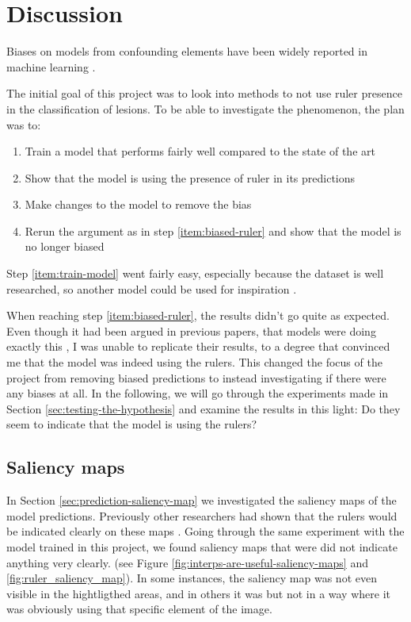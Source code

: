 \chapter{Discussion}
Biases on models from confounding elements have been widely reported in machine learning
\cite{DeConstructing_Bias_on_Skin_Lesion_Datasets_2019, Towards_Explainable_Classifiers_Using_the_Counterfactual_Approach_2019, debias-not-so-fast, interps-are-useful}.

The initial goal of this project was to look into methods to not use ruler presence in the
classification of lesions.
To be able to investigate the phenomenon, the plan was to:
\begin{enumerate}
    \item Train a model that performs fairly well compared to the state of the art \label{item:train-model}
    \item Show that the model is using the presence of ruler in its predictions \label{item:biased-ruler}
    \item Make changes to the model to remove the bias
    \item Rerun the argument as in step \ref{item:biased-ruler} and show that the model is no longer biased
\end{enumerate}
Step \ref{item:train-model} went fairly easy, especially because the dataset is well researched,
so another model could be used for inspiration \cite{kaggle-97-model}.

When reaching step \ref{item:biased-ruler}, the results didn't go quite as expected.
Even though it had been argued in previous papers, that models were doing exactly this
\cite{debias-not-so-fast,interps-are-useful}, I was unable to replicate their results,
to a degree that convinced me that the model was indeed using the rulers.
This changed the focus of the project from removing biased predictions to instead investigating
if there were any biases at all.
In the following, we will go through the experiments made in Section \ref{sec:testing-the-hypothesis} and
examine the results in this light: Do they seem to indicate that the model is using the rulers?

\section{Saliency maps}
In Section \ref{sec:prediction-saliency-map} we investigated the saliency maps of the model predictions.
Previously other researchers had shown that the rulers would be indicated clearly on these maps \cite{interps-are-useful}.
Going through the same experiment with the model trained in this project, we found saliency maps that were
did not indicate anything very clearly. 
(see Figure \ref{fig:interps-are-useful-saliency-maps} and \ref{fig:ruler_saliency_map}).
In some instances, the saliency map was not even visible in the hightligthed areas,
and in others it was but not in a way where it was obviously using that specific element of the image.

